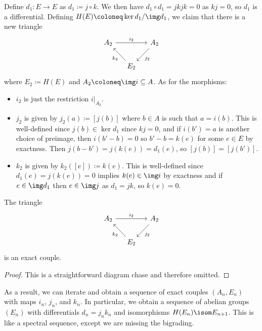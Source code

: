Define $d_1\colon E \to E$ as $d_1 \coloneq j \circ k$.
We then have $d_1 \circ d_1 = jkjk = 0$ as $kj = 0$, so $d_1$ is a differential.
Defining $H(E) \coloneq \ker d_1 / \img d_1$, we claim that there is a new triangle
\begin{equation*}
	\begin{tikzcd}[column sep = small]
		A_2
				\ar[rr, "i_2"]
			& & A_2
				\ar[dl, "j_2"]
		\\
			& E_2
				\ar[ul, "k_2"]
	\end{tikzcd}
\end{equation*}
where $E_2 \coloneq H(E)$ and $A_2 \coloneq \img i \subseteq A$.
As for the morphisms:
\begin{itemize}
	\item $i_2$ is just the restriction $i|_{A_2}$.
	\item $j_2$ is given by $j_2(a) \coloneq [j(b)]$ where $b \in A$ is such that $a = i(b)$.
		This is well-defined since $j(b) \in \ker d_1$ since $kj = 0$, and if $i(b') = a$ is another choice of preimage, then $i(b' - b) = 0$ so $b' - b = k(e)$ for some $e \in E$ by exactness.
		Then $j(b - b') = j(k(e)) = d_1(e)$, so $[j(b)] = [j(b')]$.
	\item $k_2$ is given by $k_2([e]) \coloneq k(e)$.
		This is well-defined since $d_1(e) = j(k(e)) = 0$ implies $k(e) \in \img i$ by exactness and if $e \in \img d_1$ then $e \in \img j$ as $d_1 = jk$, so $k(e) = 0$.
\end{itemize}
\begin{lemma}
	The triangle
	\begin{equation*}
		\begin{tikzcd}[column sep = small]
			A_2
					\ar[rr, "i_2"]
				& & A_2
					\ar[dl, "j_2"]
			\\
				& E_2
					\ar[ul, "k_2"]
		\end{tikzcd}
	\end{equation*}
	is an exact couple.
\end{lemma}
\begin{proof}
	This is a straightforward diagram chase and therefore omitted.
\end{proof}
As a result, we can iterate and obtain a sequence of exact couples $(A_n, E_n)$ with maps $i_n$, $j_n$, and $k_n$.
In particular, we obtain a sequence of abelian groups $(E_n)$ with differentials $d_n = j_n k_n$ and isomorphisms $H(E_n) \isom E_{n + 1}$.
This is like a spectral sequence, except we are missing the bigrading.

